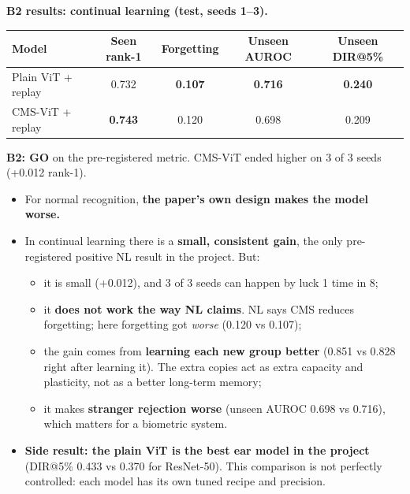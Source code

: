 \documentclass[11pt,a4paper]{article}
\begin{document}
\textbf{B2 results: continual learning (test, seeds 1--3).}
\begin{center}
\begin{tabular}{@{}lcccc@{}}
\toprule
\textbf{Model} & \textbf{Seen rank-1} & \textbf{Forgetting} & \textbf{Unseen AUROC} & \textbf{Unseen DIR@5\%}\\
\midrule
Plain ViT + replay & 0.732 & \textbf{0.107} & \textbf{0.716} & \textbf{0.240}\\
CMS-ViT + replay & \textbf{0.743} & 0.120 & 0.698 & 0.209\\
\bottomrule
\end{tabular}
\end{center}

\begin{verdict}
\textbf{B2: GO} on the pre-registered metric. CMS-ViT ended higher on 3 of 3 seeds (+0.012 rank-1).
\end{verdict}

\begin{means}
\begin{itemize}[leftmargin=1.2em]
  \item For normal recognition, \textbf{the paper's own design makes the model worse.}
  \item In continual learning there is a \textbf{small, consistent gain}, the only pre-registered positive NL result in the project. But:
  \begin{itemize}
    \item it is small (+0.012), and 3 of 3 seeds can happen by luck 1 time in 8;
    \item it \textbf{does not work the way NL claims}. NL says CMS reduces forgetting; here forgetting got \emph{worse} (0.120 vs 0.107);
    \item the gain comes from \textbf{learning each new group better} (0.851 vs 0.828 right after learning it). The extra copies act as extra capacity and plasticity, not as a better long-term memory;
    \item it makes \textbf{stranger rejection worse} (unseen AUROC 0.698 vs 0.716), which matters for a biometric system.
  \end{itemize}
  \item \textbf{Side result: the plain ViT is the best ear model in the project} (DIR@5\% 0.433 vs 0.370 for ResNet-50). This comparison is not perfectly controlled: each model has its own tuned recipe and precision.
\end{itemize}
\end{means}
\end{document}
